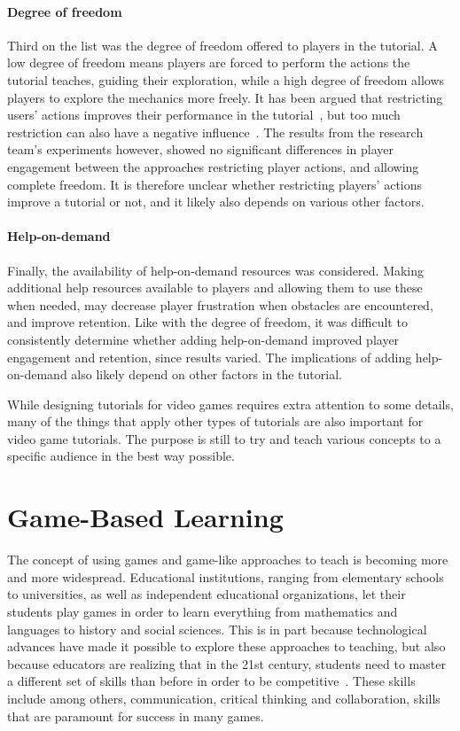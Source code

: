 \paragraph{Degree of freedom} Third on the list was the degree of freedom offered to players in the tutorial. A low degree of freedom means players are forced to perform the actions the tutorial teaches, guiding their exploration, while a high degree of freedom allows players to explore the mechanics more freely. It has been argued that restricting users' actions improves their performance in the tutorial~\cite{kelleher:stencils}, but too much restriction can also have a negative influence~\cite{bonawitz:double_edged_pedagogy}. The results from the research team's experiments however, showed no significant differences in player engagement between the approaches restricting player actions, and allowing complete freedom. It is therefore unclear whether restricting players' actions improve a tutorial or not, and it likely also depends on various other factors.

\paragraph{Help-on-demand} Finally, the availability of help-on-demand resources was considered. Making additional help resources available to players and allowing them to use these when needed, may decrease player frustration when obstacles are encountered, and improve retention. Like with the degree of freedom, it was difficult to consistently determine whether adding help-on-demand improved player engagement and retention, since results varied. The implications of adding help-on-demand also likely depend on other factors in the tutorial.

\noindent
While designing tutorials for video games requires extra attention to some details, many of the things that apply other types of tutorials are also important for video game tutorials. The purpose is still to try and teach various concepts to a specific audience in the best way possible.

\section{Game-Based Learning}
\label{sec:game_based_learning}
The concept of using games and game-like approaches to teach is becoming more and more widespread. Educational institutions, ranging from elementary schools to universities, as well as independent educational organizations, let their students play games in order to learn everything from mathematics and languages to history and social sciences. This is in part because technological advances have made it possible to explore these approaches to teaching, but also because educators are realizing that in the 21st century, students need to master a different set of skills than before in order to be competitive~\cite{nea:four_cs}. These skills include among others, communication, critical thinking and collaboration, skills that are paramount for success in many games.

